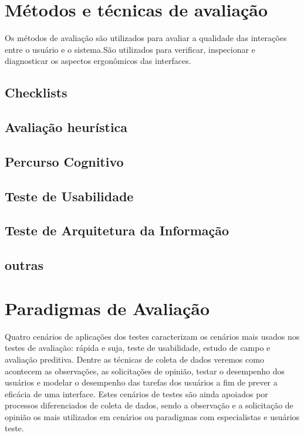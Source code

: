 
\section{Métodos e técnicas de avaliação}

Os métodos de avaliação são utilizados para avaliar a qualidade das interações entre o usuário e o sistema.São utilizados para verificar, inspecionar e diagnosticar os aspectos ergonômicos das interfaces.

\subsection{Checklists}

\subsection{Avaliação heurística}

\subsection{Percurso Cognitivo}

\subsection{Teste de Usabilidade}

\subsection{Teste de Arquitetura da Informação}

\subsection{outras}



\section{Paradigmas de Avaliação}

Quatro cenários de aplicações dos testes caracterizam os cenários mais usados nos testes de avaliação: rápida e suja, teste de usabilidade, estudo de campo e avaliação preditiva. Dentre as técnicas de coleta de dados veremos como acontecem as observações, as solicitações de opinião, testar o desempenho dos usuários e modelar o desempenho das tarefas dos usuários a fim de prever a eficácia de uma interface. Estes cenários de testes são ainda apoiados por processos diferenciados de coleta de dados, sendo a observação e a solicitação de opinião os mais utilizados em cenários ou paradigmas com especialistas e usuários teste.

